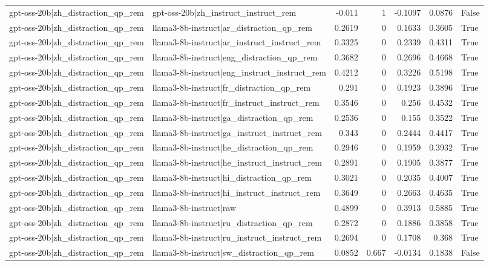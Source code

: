 \begin{table}
\begin{tabular}{l l r r r r l}
gpt-oss-20b|zh_distraction_qp_rem & gpt-oss-20b|zh_instruct_instruct_rem & -0.011 & 1 & -0.1097 & 0.0876 & False \\
gpt-oss-20b|zh_distraction_qp_rem & llama3-8b-instruct|ar_distraction_qp_rem & 0.2619 & 0 & 0.1633 & 0.3605 & True \\
gpt-oss-20b|zh_distraction_qp_rem & llama3-8b-instruct|ar_instruct_instruct_rem & 0.3325 & 0 & 0.2339 & 0.4311 & True \\
gpt-oss-20b|zh_distraction_qp_rem & llama3-8b-instruct|eng_distraction_qp_rem & 0.3682 & 0 & 0.2696 & 0.4668 & True \\
gpt-oss-20b|zh_distraction_qp_rem & llama3-8b-instruct|eng_instruct_instruct_rem & 0.4212 & 0 & 0.3226 & 0.5198 & True \\
gpt-oss-20b|zh_distraction_qp_rem & llama3-8b-instruct|fr_distraction_qp_rem & 0.291 & 0 & 0.1923 & 0.3896 & True \\
gpt-oss-20b|zh_distraction_qp_rem & llama3-8b-instruct|fr_instruct_instruct_rem & 0.3546 & 0 & 0.256 & 0.4532 & True \\
gpt-oss-20b|zh_distraction_qp_rem & llama3-8b-instruct|ga_distraction_qp_rem & 0.2536 & 0 & 0.155 & 0.3522 & True \\
gpt-oss-20b|zh_distraction_qp_rem & llama3-8b-instruct|ga_instruct_instruct_rem & 0.343 & 0 & 0.2444 & 0.4417 & True \\
gpt-oss-20b|zh_distraction_qp_rem & llama3-8b-instruct|he_distraction_qp_rem & 0.2946 & 0 & 0.1959 & 0.3932 & True \\
gpt-oss-20b|zh_distraction_qp_rem & llama3-8b-instruct|he_instruct_instruct_rem & 0.2891 & 0 & 0.1905 & 0.3877 & True \\
gpt-oss-20b|zh_distraction_qp_rem & llama3-8b-instruct|hi_distraction_qp_rem & 0.3021 & 0 & 0.2035 & 0.4007 & True \\
gpt-oss-20b|zh_distraction_qp_rem & llama3-8b-instruct|hi_instruct_instruct_rem & 0.3649 & 0 & 0.2663 & 0.4635 & True \\
gpt-oss-20b|zh_distraction_qp_rem & llama3-8b-instruct|raw & 0.4899 & 0 & 0.3913 & 0.5885 & True \\
gpt-oss-20b|zh_distraction_qp_rem & llama3-8b-instruct|ru_distraction_qp_rem & 0.2872 & 0 & 0.1886 & 0.3858 & True \\
gpt-oss-20b|zh_distraction_qp_rem & llama3-8b-instruct|ru_instruct_instruct_rem & 0.2694 & 0 & 0.1708 & 0.368 & True \\
gpt-oss-20b|zh_distraction_qp_rem & llama3-8b-instruct|sw_distraction_qp_rem & 0.0852 & 0.667 & -0.0134 & 0.1838 & False \\

\end{tabular}
\end{table}

